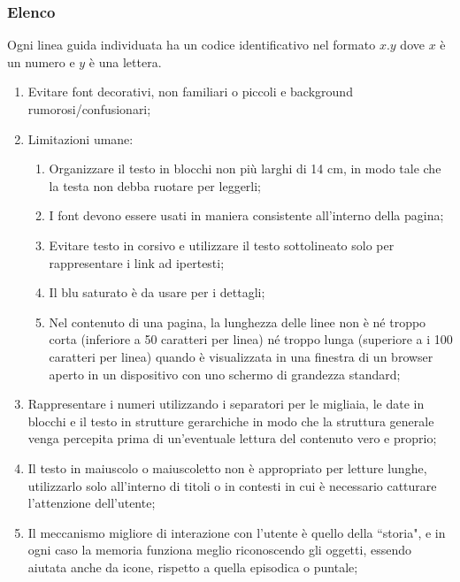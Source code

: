 \subsubsection{Elenco}
\label{sss:elenco}
Ogni linea guida individuata ha un codice identificativo nel formato $x.y$ dove $x$ è un numero e $y$ è una lettera.
\begin{enumerate}
    \item Evitare font decorativi, non familiari o piccoli e background rumorosi/confusionari; \label{lg:1}
    \item Limitazioni umane:\label{lg:2} 
    \begin{enumerate}[label=\alph*.]
        \item Organizzare il testo in blocchi non più larghi di 14 cm, in modo tale che la testa non debba ruotare per leggerli;\label{lg:2.a}
        \item I font devono essere usati in maniera consistente all'interno della pagina;\label{lg:2.b}
        \item Evitare testo in corsivo e utilizzare il testo sottolineato solo per rappresentare i link ad ipertesti;\label{lg:2.c}
        \item Il blu saturato è da usare per i dettagli;\label{lg:2.d}
        \item Nel contenuto di una pagina, la lunghezza delle linee non è né troppo corta (inferiore a 50 caratteri per linea) né troppo lunga (superiore a i 100 caratteri per linea) quando è visualizzata in una finestra di un browser aperto in un dispositivo con uno schermo di grandezza standard;\label{lg:2.e}
    \end{enumerate}
    \item Rappresentare i numeri utilizzando i separatori per le migliaia, le date in blocchi e il testo in strutture gerarchiche in modo che la struttura generale venga percepita prima di un'eventuale lettura del contenuto vero e proprio;\label{lg:3}
    \item Il testo in maiuscolo o maiuscoletto non è appropriato per letture lunghe, utilizzarlo solo all'interno di titoli o in contesti in cui è necessario catturare l'attenzione dell'utente;\label{lg:4}
    \item Il meccanismo migliore di interazione con l'utente è quello della ``storia", e in ogni caso la memoria funziona meglio riconoscendo gli oggetti, essendo aiutata anche da icone, rispetto a quella episodica o puntale;\label{lg:5}
    \begin{enumerate}[label=\alph*.]

\end{enumerate}
\end{enumerate}
